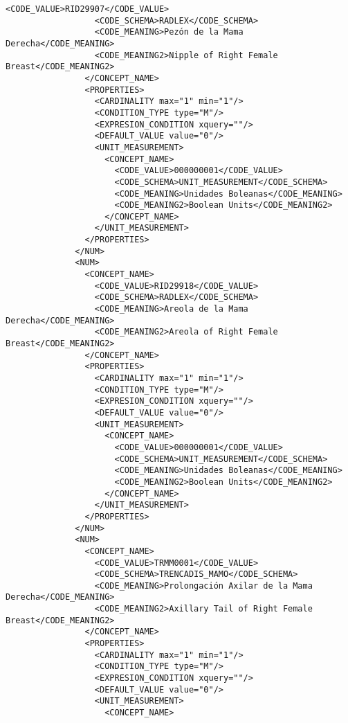 \begin{lstlisting}[label=some-code,caption=Some Code]
                  <CODE_VALUE>RID29907</CODE_VALUE>
                  <CODE_SCHEMA>RADLEX</CODE_SCHEMA>
                  <CODE_MEANING>Pezón de la Mama Derecha</CODE_MEANING>
                  <CODE_MEANING2>Nipple of Right Female Breast</CODE_MEANING2>
                </CONCEPT_NAME>
                <PROPERTIES>
                  <CARDINALITY max="1" min="1"/>
                  <CONDITION_TYPE type="M"/>
                  <EXPRESION_CONDITION xquery=""/>
                  <DEFAULT_VALUE value="0"/>
                  <UNIT_MEASUREMENT>
                    <CONCEPT_NAME>
                      <CODE_VALUE>000000001</CODE_VALUE>
                      <CODE_SCHEMA>UNIT_MEASUREMENT</CODE_SCHEMA>
                      <CODE_MEANING>Unidades Boleanas</CODE_MEANING>
                      <CODE_MEANING2>Boolean Units</CODE_MEANING2>
                    </CONCEPT_NAME>
                  </UNIT_MEASUREMENT>
                </PROPERTIES>
              </NUM>
              <NUM>
                <CONCEPT_NAME>
                  <CODE_VALUE>RID29918</CODE_VALUE>
                  <CODE_SCHEMA>RADLEX</CODE_SCHEMA>
                  <CODE_MEANING>Areola de la Mama Derecha</CODE_MEANING>
                  <CODE_MEANING2>Areola of Right Female Breast</CODE_MEANING2>
                </CONCEPT_NAME>
                <PROPERTIES>
                  <CARDINALITY max="1" min="1"/>
                  <CONDITION_TYPE type="M"/>
                  <EXPRESION_CONDITION xquery=""/>
                  <DEFAULT_VALUE value="0"/>
                  <UNIT_MEASUREMENT>
                    <CONCEPT_NAME>
                      <CODE_VALUE>000000001</CODE_VALUE>
                      <CODE_SCHEMA>UNIT_MEASUREMENT</CODE_SCHEMA>
                      <CODE_MEANING>Unidades Boleanas</CODE_MEANING>
                      <CODE_MEANING2>Boolean Units</CODE_MEANING2>
                    </CONCEPT_NAME>
                  </UNIT_MEASUREMENT>
                </PROPERTIES>
              </NUM>
              <NUM>
                <CONCEPT_NAME>
                  <CODE_VALUE>TRMM0001</CODE_VALUE>
                  <CODE_SCHEMA>TRENCADIS_MAMO</CODE_SCHEMA>
                  <CODE_MEANING>Prolongación Axilar de la Mama Derecha</CODE_MEANING>
                  <CODE_MEANING2>Axillary Tail of Right Female Breast</CODE_MEANING2>
                </CONCEPT_NAME>
                <PROPERTIES>
                  <CARDINALITY max="1" min="1"/>
                  <CONDITION_TYPE type="M"/>
                  <EXPRESION_CONDITION xquery=""/>
                  <DEFAULT_VALUE value="0"/>
                  <UNIT_MEASUREMENT>
                    <CONCEPT_NAME>

\end{lstlisting}
